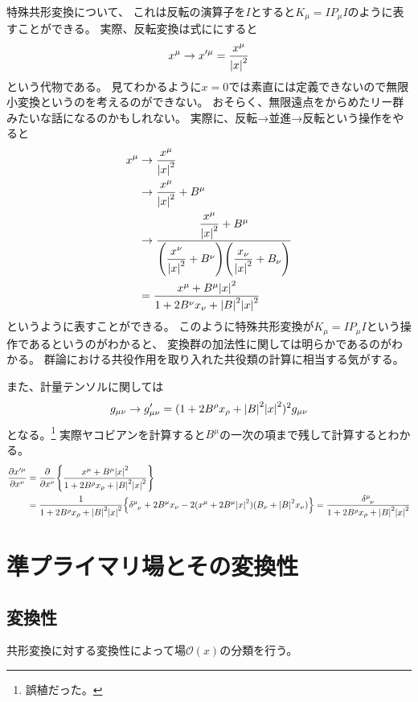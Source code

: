 \documentclass[../../master.tex]{subfiles}
\begin{document}
特殊共形変換について、
これは反転の演算子を\(I\)とすると\(K_\mu = I P_\mu I\)のように表すことができる。
実際、反転変換は式ににすると
\begin{equation}
    x^\mu \rightarrow x'^\mu = \frac{x^\mu}{\abs{x}^2}
\end{equation}
という代物である。
見てわかるように\(x=0\)では素直には定義できないので無限小変換というのを考えるのができない。
おそらく、無限遠点をからめたリー群みたいな話になるのかもしれない。
実際に、反転→並進→反転という操作をやると
\begin{align}
    x^\mu
    &\rightarrow \frac{x^\mu}{\abs{x}^2}\notag\\
    &\rightarrow \frac{x^\mu}{\abs{x}^2} + B^\mu\notag\\
    &\rightarrow \dfrac{\dfrac{x^\mu}{\abs{x}^2} + B^\mu}{\qty(\dfrac{x^\nu}{\abs{x}^2} + B^\nu)\qty(\dfrac{x_\nu}{\abs{x}^2} + B_\nu)} \notag\\
    &=\frac{x^\mu  + B^\mu\abs{x}^2}{1+2B^\nu x_\nu +\abs{B}^2\abs{x}^2}
\end{align}
というように表すことができる。
このように特殊共形変換が\(K_\mu = I P_\mu I\)という操作であるというのがわかると、
変換群の加法性に関しては明らかであるのがわかる。
群論における共役作用を取り入れた共役類の計算に相当する気がする。

また、計量テンソルに関しては
\begin{equation}
    g_{\mu\nu} \rightarrow g'_{\mu\nu} = (1+2B^\rho x_\rho +\abs{B}^2\abs{x}^2)^2 g_{\mu\nu}
\end{equation}
となる。\footnote{誤植だった。}
実際ヤコビアンを計算すると\(B^\mu\)の一次の項まで残して計算するとわかる。
\begin{align*}
    \pdv{x'^\mu}{x^\nu}
    &=\pdv{x^\nu}\qty{\frac{x^\mu  + B^\mu\abs{x}^2}{1+2B^\rho x_\rho +\abs{B}^2\abs{x}^2}}\\
    &=\frac{1}{1+2B^\rho x_\rho +\abs{B}^2\abs{x}^2}\qty{
        \tensor{\delta}{^\mu_\nu}+2B^\mu x_\nu -2(x^\mu+2B^\mu\abs{x}^2)(B_\nu + \abs{B}^2x_\nu)
    }
    =\frac{\tensor{\delta}{^\mu_\nu}}{1+2B^\rho x_\rho +\abs{B}^2\abs{x}^2}
\end{align*}

\section{準プライマリ場とその変換性}
\subsection*{変換性}
共形変換に対する変換性によって場\(\mathcal{O}(x)\)の分類を行う。
\end{document}
